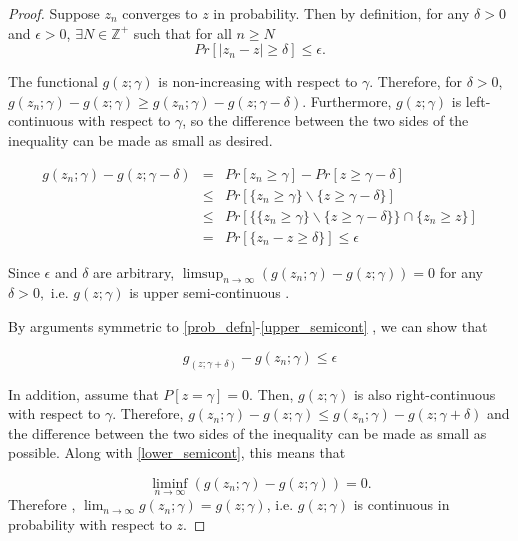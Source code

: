 \documentclass[12pt]{article} %
\begin{document}
\begin{proof}
Suppose $z_n$ converges to $z$ in probability. Then by definition, for any  $\delta>0$ and  $\epsilon>0$, $\exists	N\in\mathbb{Z^+}$ such that for all   $n \geq N$ 
$$ Pr\left[\left|z_n-z\right| \geq \delta \right] \leq \epsilon.$$

 The functional  $g(z;\gamma)$ is  non-increasing with respect to $\gamma$. Therefore, for $\delta>0$, 
$g(z_n;\gamma) -g(z;\gamma) \geq g(z_n;\gamma) -g(z;\gamma-\delta) $. Furthermore, $g(z;\gamma)$ is left-continuous with respect to $\gamma$, so the difference between the two sides of the inequality can be made as small as desired.

\begin{eqnarray}
g(z_n;\gamma) - g(z;\gamma-\delta) & = &Pr\left[z_n\geq \gamma \right] -Pr\left[z \geq  \gamma - \delta \right] \label{prob_defn}\\
& \leq &  Pr\left[\{z_n \geq \gamma \} \backslash \{z \geq \gamma - \delta \} \right] \label{set_diff}\\
& \leq & Pr\left[\{\{z_n \geq \gamma \} \backslash \{z \geq \gamma - \delta \} \} \cap \{z_n \geq  z\} \right] \label{conjunct_with_set} \\
& =  & Pr\left[\{z_n - z \geq \delta \} \right] \leq \epsilon \label{upper_semicont}
\end{eqnarray}
 
Since $\epsilon$ and $\delta$ are arbitrary,
 $ \limsup_{n \rightarrow \infty} ( {g(z_n;\gamma)}- g(z;\gamma) ) =  0$ for any $\delta>0, $ i.e. $g(z;\gamma)$ is upper semi-continuous .

By arguments  symmetric to  \eqref{prob_defn}-\eqref{upper_semicont} , we can show that

\begin{equation}
g_(z;\gamma+\delta) - g(z_n;\gamma) \leq \epsilon \label{lower_semicont}
\end{equation}


In addition, assume that  $P\left[z = \gamma \right]=0$. Then, $g(z;\gamma)$ is also right-continuous with respect to $\gamma$. Therefore, 
$g(z_n;\gamma) -g(z;\gamma) \leq g(z_n;\gamma) -g(z;\gamma+\delta)$ and the difference between the two sides of the inequality can be made as small as possible. Along with \ref{lower_semicont}, this means that

 \[ 
\liminf_{n \rightarrow \infty} ( {g(z_n;\gamma)}- g(z;\gamma) ) = 0. 
\] Therefore , $\lim_{n\rightarrow \infty}g(z_n;\gamma) = g(z;\gamma)$, i.e. $g(z;\gamma)$ is continuous in probability with respect to $z$.
\end{proof}
\end{document}
